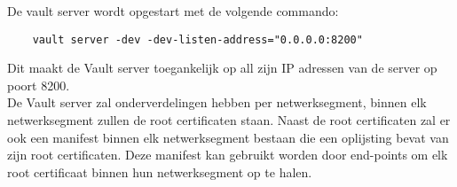 
\pagebreak

De vault server wordt opgestart met de volgende commando:
\begin{verbatim}
    vault server -dev -dev-listen-address="0.0.0.0:8200"
\end{verbatim}

Dit maakt de Vault server toegankelijk op all zijn IP adressen van de server op poort 8200. \\
De Vault server zal onderverdelingen hebben per netwerksegment, binnen elk netwerksegment zullen de root certificaten staan. Naast de root certificaten zal er ook een manifest binnen elk netwerksegment bestaan die een oplijsting bevat van zijn root certificaten. 
Deze manifest kan gebruikt worden door end-points om elk root certificaat binnen hun netwerksegment op te halen. \\

